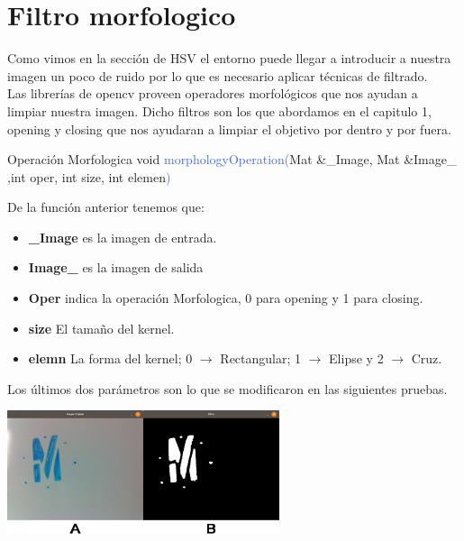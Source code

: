 \section{Filtro morfologico}
Como vimos en la sección de HSV el entorno puede llegar a introducir a nuestra
imagen un poco de ruido por lo que es necesario aplicar técnicas de filtrado.\\
Las librerías de opencv proveen operadores morfológicos que nos ayudan a limpiar
nuestra imagen.
Dicho filtros son los que abordamos en el capitulo 1, opening y closing que nos ayudaran
a limpiar el objetivo por dentro y por fuera.
\begin{example}[label={ex:serie}]{Operación Morfologica}
	\textcolor{Mulberry}{void} \textcolor{RoyalBlue}{morphologyOperation(}\textcolor{BurntOrange}{Mat}  
	\textcolor{Mulberry}{\&}\textcolor{Bittersweet}{\_Image}, \textcolor{BurntOrange}{Mat} \textcolor{Mulberry}{\&}\textcolor{Bittersweet}{Image\_}
	,\textcolor{Mulberry}{int} \textcolor{Bittersweet}{oper}, \textcolor{Mulberry}{int} \textcolor{Bittersweet}{size},
	\textcolor{Mulberry}{int} \textcolor{Bittersweet}{elemen}\textcolor{RoyalBlue}{)}
\end{example}
De la función anterior tenemos que:
\begin{itemize}
	\item \textbf{\_Image} es la imagen de entrada.
	\item \textbf{Image\_} es la imagen de salida
	\item \textbf{Oper} indica la operación Morfologica, 0 para opening y 1 para closing.
	\item \textbf{size} El tamaño del kernel.
	\item \textbf{elemn} La forma del kernel; 0 $\rightarrow$ Rectangular; 1 $\rightarrow$ Elipse y 
	2 $\rightarrow$ Cruz.
\end{itemize}
Los últimos dos parámetros son lo que se modificaron en las siguientes pruebas.
\begin{center}
	\includegraphics[width=0.6\textwidth]{Contenido/Cuerpo/Capitulo4/Fig16.eps}
	\label{Fig9}
\end{center}
